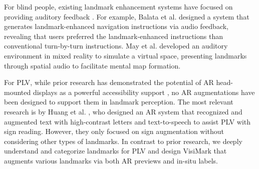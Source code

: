 For blind people, existing landmark enhancement systems have focused on providing auditory feedback \cite{balata2016automatically, balata2018landmark, may2020spotlights, fiannaca2014headlock, coroama2003chatty}. For example, Balata et al. \cite{balata2016automatically, balata2018landmark} designed a system that generates landmark-enhanced navigation instructions via audio feedback, revealing that users preferred the landmark-enhanced instructions than conventional turn-by-turn instructions. May et al. \cite{may2020spotlights} developed an auditory environment in mixed reality to simulate a virtual space, presenting landmarks through spatial audio to facilitate mental map formation.

For PLV, while prior research has demonstrated the potential of AR head-mounted displays as a powerful accessibility support \cite{zhao2017understanding, min2021augmented}, no AR augmentations have been designed to support them in landmark perception. The most relevant research is by Huang et al. \cite{huang2019augmented}, who designed an AR system that recognized and augmented text with high-contrast letters and text-to-speech to assist PLV with sign reading. However, they only focused on sign augmentation without considering other types of landmarks. In contrast to prior research, we deeply understand and categorize landmarks for PLV and design VisiMark that augments various landmarks via both AR previews and in-situ labels.



